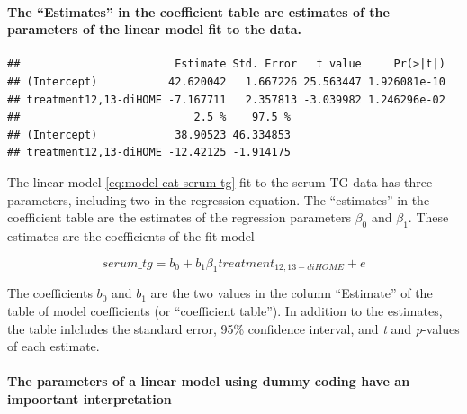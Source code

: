 \documentclass[]{book}
\let\oldparagraph\paragraph
\renewcommand{\paragraph}[1]{\oldparagraph{#1}\mbox{}}
\begin{document}
\hypertarget{the-estimates-in-the-coefficient-table-are-estimates-of-the-parameters-of-the-linear-model-fit-to-the-data.}{%
\paragraph{The ``Estimates'' in the coefficient table are estimates of the parameters of the linear model fit to the data.}\label{the-estimates-in-the-coefficient-table-are-estimates-of-the-parameters-of-the-linear-model-fit-to-the-data.}}

\begin{verbatim}
##                        Estimate Std. Error   t value     Pr(>|t|)
## (Intercept)           42.620042   1.667226 25.563447 1.926081e-10
## treatment12,13-diHOME -7.167711   2.357813 -3.039982 1.246296e-02
##                           2.5 %    97.5 %
## (Intercept)            38.90523 46.334853
## treatment12,13-diHOME -12.42125 -1.914175
\end{verbatim}

The linear model \eqref{eq:model-cat-serum-tg} fit to the serum TG data has three parameters, including two in the regression equation. The ``estimates'' in the coefficient table are the estimates of the regression parameters \(\beta_0\) and \(\beta_1\). These estimates are the coefficients of the fit model

\begin{equation}
serum\_tg = b_0 + b_1 \beta_1 treatment_{12,13-diHOME} + e
\label{eq:fit-serum-tg}
\end{equation}

The coefficients \(b_0\) and \(b_1\) are the two values in the column ``Estimate'' of the table of model coefficients (or ``coefficient table''). In addition to the estimates, the table inlcludes the standard error, 95\% confidence interval, and \emph{t} and \emph{p}-values of each estimate.

\hypertarget{the-parameters-of-a-linear-model-using-dummy-coding-have-an-impoortant-interpretation}{%
\paragraph{The parameters of a linear model using dummy coding have an impoortant interpretation}\label{the-parameters-of-a-linear-model-using-dummy-coding-have-an-impoortant-interpretation}}
\end{document}
